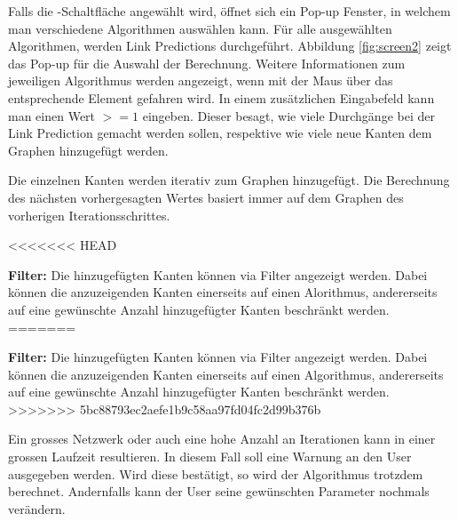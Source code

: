 Falls die -Schaltfläche angewählt wird, öffnet sich ein Pop-up Fenster, in welchem man verschiedene Algorithmen auswählen
kann. Für alle ausgewählten Algorithmen, werden Link Predictions durchgeführt.
Abbildung \ref{fig:screen2} zeigt das Pop-up für die Auswahl der Berechnung.
Weitere Informationen zum jeweiligen Algorithmus werden angezeigt, wenn mit der Maus über das entsprechende Element gefahren wird.
In einem zusätzlichen Eingabefeld kann man einen Wert $>= 1$ eingeben.
Dieser besagt, wie viele Durchgänge bei der Link Prediction gemacht werden sollen, respektive wie viele neue Kanten dem Graphen hinzugefügt werden.

Die einzelnen Kanten werden iterativ zum Graphen hinzugefügt. Die Berechnung des nächsten vorhergesagten Wertes basiert immer auf dem Graphen des vorherigen Iterationsschrittes.

<<<<<<< HEAD
\item \textbf{Filter:} Die hinzugefügten Kanten können via Filter angezeigt werden.
Dabei können die anzuzeigenden Kanten einerseits auf einen Alorithmus, andererseits auf eine gewünschte Anzahl hinzugefügter Kanten beschränkt werden.
=======
\item \textbf{Filter:} Die hinzugefügten Kanten können via Filter angezeigt werden. Dabei können die anzuzeigenden Kanten einerseits auf einen Algorithmus, andererseits auf eine gewünschte Anzahl hinzugefügter Kanten beschränkt werden.
>>>>>>> 5bc88793ec2aefe1b9c58aa97fd04fc2d99b376b


Ein grosses Netzwerk oder auch eine hohe Anzahl an Iterationen kann in einer grossen Laufzeit resultieren.
In diesem Fall soll eine Warnung an den User ausgegeben werden. Wird diese bestätigt, so wird der Algorithmus trotzdem berechnet. Andernfalls kann der User seine gewünschten
Parameter nochmals verändern.

